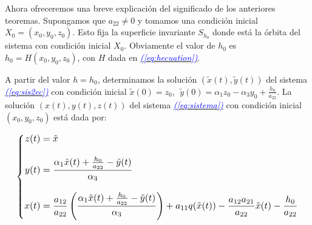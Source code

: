 \documentclass[12pt,a4paper]{report} %
\newcommand{\eref}[1]{\hyperref[#1]{\textcolor{blue}{\textit{(\ref*{#1})}}}}
\begin{document}
	\vspace{0.5cm}Ahora ofreceremos una breve explicación del significado de los anteriores teoremas. Supongamos que $a_{22}\neq 0$ y tomamos una condición inicial $X_0=(x_0,y_0,z_0)$. Esto fija la superficie invariante $S_{h_0}$ donde está la órbita del sistema con condición inicial $X_0$. Obviamente el valor de $h_0$ es $h_0=H(x_0,y_0,z_0)$, con $H$ dada en \eref{eq:hecuation}.
	
	\vspace{0.5cm}A partir del valor $h=h_0$, determinamos la solución $\left( \tilde{x}(t),\tilde{y}(t) \right)$ del sistema \eref{eq:sis2ec} con condición inicial $\tilde{x}(0)=z_0$, $\; \tilde{y}(0)=\alpha_1z_0-\alpha_3y_0+\frac{h_0}{a_{22}}$. La solución $(x(t),y(t),z(t))$ del sistema \eref{eq:sistema} con condición inicial $(x_0,y_0,z_0)$ está dada por:
	
	\begin{equation}
		\label{eq:solsis}
		\scalebox{1.1}{$\displaystyle
			\left\{
			\begin{aligned}
				z(t)&=\tilde{x} \\[3mm]
				y(t)&= \frac{\alpha_1\tilde{x}(t)+\frac{h_0}{a_{22}}-\tilde{y}(t)}{\alpha_3}\\[3mm]
				x(t)&=\frac{a_{12}}{a_{22}}\left( \frac{\alpha_1\tilde{x}(t)+\frac{h_0}{a_{22}}-\tilde{y}(t)}{\alpha_3} \right) +a_{11}q(\tilde{x}(t))-\frac{a_{12}a_{21}}{a_{22}}\tilde{x}(t)-\frac{h_0}{a_{22}}
			\end{aligned}
			\right.
			$}
	\end{equation}\smallskip
	

	
\end{document}

